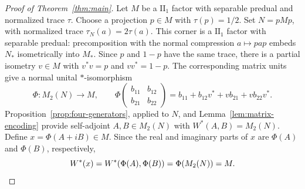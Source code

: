 \begin{proof}[Proof of Theorem~\ref{thm:main}]
Let $M$ be a $\mathrm{II}_1$ factor with separable predual and
normalized trace $\tau$. Choose a projection $p\in M$ with
$\tau(p)=1/2$. Set $N=pMp$, with normalized trace
$\tau_N(a)=2\tau(a)$. This corner is a $\mathrm{II}_1$ factor
with separable predual: precomposition with the normal compression
$a\mapsto pap$ embeds $N_*$ isometrically into $M_*$.
Since $p$ and $1-p$ have the same trace,
there is a partial isometry $v\in M$ with $v^*v=p$ and
$vv^*=1-p$. The corresponding matrix units give a normal
unital $*$-isomorphism
\[
 \Phi:M_2(N)\longrightarrow M,\qquad
 \Phi\begin{pmatrix}b_{11}&b_{12}\\b_{21}&b_{22}\end{pmatrix}
 =b_{11}+b_{12}v^*+vb_{21}+vb_{22}v^*.
\]
Proposition~\ref{prop:four-generators}, applied to $N$, and
Lemma~\ref{lem:matrix-encoding} provide self-adjoint $A,B\in M_2(N)$
with $W^*(A,B)=M_2(N)$. Define
$x=\Phi(A+iB)\in M$. Since the real and imaginary parts of $x$
are $\Phi(A)$ and $\Phi(B)$, respectively,
\[
 W^*(x)=W^*(\Phi(A),\Phi(B))=\Phi(M_2(N))=M.\qedhere
\]
\end{proof}
